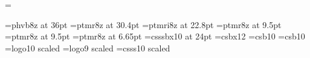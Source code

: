 


\def\protect{\noexpand\noexpand\noexpand}

\newtoks\pagetoks
\pagetoks={\the\pageno}

\newcount\chaptercnt
{}



\ifx\pdfoutput\udefined
\else
\fi



\def\setgray{%
  \ifx\pdfoutput\undefined
    \special{ps: 0.8 setgray}%
  \else
    \pdfsetcolor{0 0 0 0.2}%
  \fi
}

\def\setblack{%
  \ifx\pdfoutput\undefined
    \special{ps: 0 setgray}%
  \else
    \pdfsetcolor\cmykBlack%
  \fi
}

\def\setred{%
  \ifx\pdfoutput\undefined
    \special{ps: 0.3 1 1 0 setcmykcolor}%
  \else
    \pdfsetcolor{0.3 1 1 0}%
  \fi
}

\ifx\pdfoutput\undefined
  \def\makeheadline{%
    \vbox to 0pt{
      \vskip-27.5pt%
      \line{%
        \vbox to 8.5pt{}%
        \the\headline
      }%
      \vss
    }%
    \nointerlineskip
  }%
\else
  \let\setcolor=\pdfsetcolor
  \def\makeheadline{%
    \vbox to 0pt{
      \vskip-27.5pt%
      \line{%
        \vbox to 8.5pt{}%
        \pdfsetcolor{\maincolor}%
        \the\headline
      }%
      \vss
    }%
    \nointerlineskip
  }%
\fi



\newcount\scl{}

\font\titlefnta=phvb8z at 36pt
\font\titlefntb=ptmr8z at 30.4pt
\font\titlefntc=ptmri8z at 22.8pt
\font\titlefntd=ptmr8z at 9.5pt
\font\titlefnte=ptmr8z at 9.5pt
\font\titlefntf=ptmr8z at 6.65pt
\font\chapterfnt=csssbx10 at 24pt
\font\articlefnt=csbx12
\font\sectionfnt=csb10
\font\paragraphfnt=csb10
\font\mflogo=logo10 scaled \scl
\font\ninemflogo=logo9 scaled \scl
\font\tensf=csss10 scaled \scl

